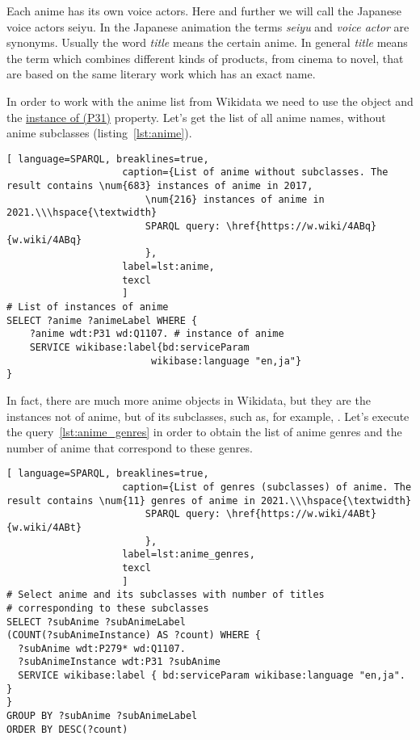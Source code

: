 Each anime has its own voice actors. Here and further we will call the Japanese voice actors seiyu. In the Japanese animation the terms \emph{seiyu} and \emph{voice actor} are synonyms. Usually the word \emph{title} means the certain anime. In general \emph{title} means the term which combines different kinds of products, from cinema to novel, that are based on the same literary work which has an exact name.

In order to work with the anime list from Wikidata we need to use the  object and the \href{https://www.wikidata.org/wiki/Property:P31}{instance of (P31)} property. Let's get the list of all anime names, without anime subclasses (listing~\protect\ref{lst:anime}).

\begin{lstlisting}[ language=SPARQL, breaklines=true, 
                    caption={List of anime without subclasses. The result contains \num{683} instances of anime in 2017, 
                        \num{216} instances of anime in 2021.\\\hspace{\textwidth}
                        SPARQL query: \href{https://w.wiki/4ABq}{w.wiki/4ABq}
                        },
                    label=lst:anime,
                    texcl 
                    ]
# List of instances of anime
SELECT ?anime ?animeLabel WHERE {
    ?anime wdt:P31 wd:Q1107. # instance of anime
    SERVICE wikibase:label{bd:serviceParam
					     wikibase:language "en,ja"}
}
\end{lstlisting}%

In fact, there are much more anime objects in Wikidata, but they are the instances not of anime, but of its subclasses, such as, for example, . Let's execute the query~\protect\ref{lst:anime_genres} in order to obtain the list of anime genres and the number of anime that correspond to these genres.

\begin{lstlisting}[ language=SPARQL, breaklines=true, 
                    caption={List of genres (subclasses) of anime. The result contains \num{11} genres of anime in 2021.\\\hspace{\textwidth}
                        SPARQL query: \href{https://w.wiki/4ABt}{w.wiki/4ABt}
                        },
                    label=lst:anime_genres,
                    texcl 
                    ]
# Select anime and its subclasses with number of titles
# corresponding to these subclasses
SELECT ?subAnime ?subAnimeLabel
(COUNT(?subAnimeInstance) AS ?count) WHERE {
  ?subAnime wdt:P279* wd:Q1107.
  ?subAnimeInstance wdt:P31 ?subAnime
  SERVICE wikibase:label { bd:serviceParam wikibase:language "en,ja". }
}
GROUP BY ?subAnime ?subAnimeLabel
ORDER BY DESC(?count)
\end{lstlisting}%

